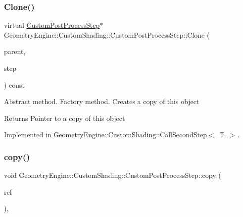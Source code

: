\subsubsection{\texorpdfstring{Clone()}{Clone()}}
{\footnotesize\ttfamily virtual \mbox{\hyperlink{class_geometry_engine_1_1_custom_shading_1_1_custom_post_process_step}{Custom\+Post\+Process\+Step}}$\ast$ Geometry\+Engine\+::\+Custom\+Shading\+::\+Custom\+Post\+Process\+Step\+::\+Clone (\begin{DoxyParamCaption}\item[{\mbox{\hyperlink{class_geometry_engine_1_1_custom_shading_1_1_custom_post_process_step_interface}{Custom\+Post\+Process\+Step\+Interface}} $\ast$}]{parent,  }\item[{\mbox{\hyperlink{namespace_geometry_engine_1_1_custom_shading_a09e44ca81de5fe08c6d50271d680c4b1}{Custom\+Post\+Process\+Steps}}}]{step }\end{DoxyParamCaption}) const\hspace{0.3cm}{\ttfamily [pure virtual]}}

Abstract method. Factory method. Creates a copy of this object \begin{DoxyReturn}{Returns}
Pointer to a copy of this object 
\end{DoxyReturn}


Implemented in \mbox{\hyperlink{class_geometry_engine_1_1_custom_shading_1_1_call_second_step_ae8f56f4c458d1916198fe5c2cdd3b9e9}{Geometry\+Engine\+::\+Custom\+Shading\+::\+Call\+Second\+Step$<$ T $>$}}.

\mbox{\label{class_geometry_engine_1_1_custom_shading_1_1_custom_post_process_step_a81947f4d632eec5b5a2b438ba81c8a2d}} 
\subsubsection{\texorpdfstring{copy()}{copy()}}
{\footnotesize\ttfamily void Geometry\+Engine\+::\+Custom\+Shading\+::\+Custom\+Post\+Process\+Step\+::copy (\begin{DoxyParamCaption}\item[{const \mbox{\hyperlink{class_geometry_engine_1_1_custom_shading_1_1_custom_post_process_step}{Custom\+Post\+Process\+Step}} \&}]{ref }\end{DoxyParamCaption})\hspace{0.3cm}{\ttfamily [protected]}, {\ttfamily [virtual]}}

